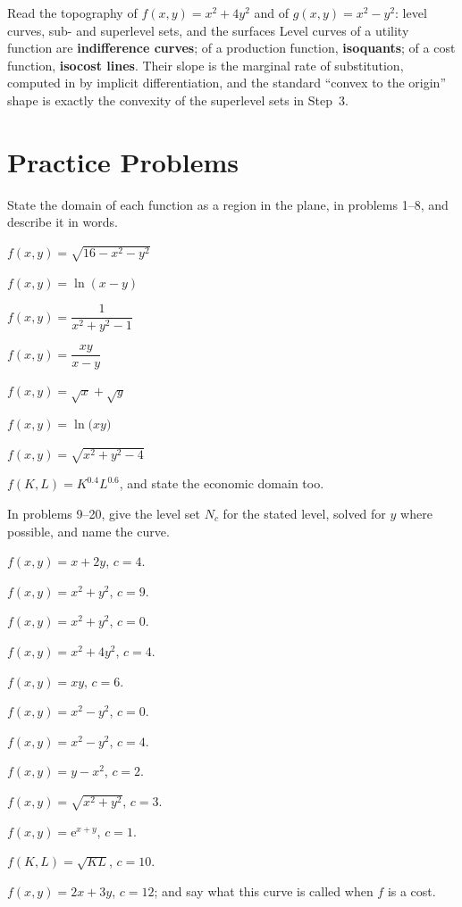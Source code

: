 \begin{worked}{Read the topography of $f(x,y)=x^{2}+4y^{2}$ and of $g(x,y)=x^{2}-y^{2}$: level curves, sub- and superlevel sets, and the surfaces}
Level curves of a utility function are \textbf{indifference curves}; of a
production function, \textbf{isoquants}; of a cost function,
\textbf{isocost lines}. Their slope is the marginal rate of substitution,
computed in  by implicit differentiation, and the standard
``convex to the origin'' shape is exactly the convexity of the superlevel
sets in Step~3.
\end{worked}

\section{Practice Problems}

State the domain of each function as a region in the plane, in problems
1--8, and describe it in words.

\begin{problems}
  \item $f(x,y)=\sqrt{16-x^{2}-y^{2}}$
  \item $f(x,y)=\ln(x-y)$
  \item $f(x,y)=\dfrac{1}{x^{2}+y^{2}-1}$
  \item $f(x,y)=\dfrac{xy}{x-y}$
  \item $f(x,y)=\sqrt{x}+\sqrt{y}$
  \item $f(x,y)=\ln\bigl(xy\bigr)$
  \item $f(x,y)=\sqrt{x^{2}+y^{2}-4}$
  \item $f(K,L)=K^{0.4}L^{0.6}$, and state the economic domain too.
\end{problems}

In problems 9--20, give the level set $N_{c}$ for the stated level, solved
for $y$ where possible, and name the curve.

\begin{problems}[resume]
  \item $f(x,y)=x+2y$, \;$c=4$.
  \item $f(x,y)=x^{2}+y^{2}$, \;$c=9$.
  \item $f(x,y)=x^{2}+y^{2}$, \;$c=0$.
  \item $f(x,y)=x^{2}+4y^{2}$, \;$c=4$.
  \item $f(x,y)=xy$, \;$c=6$.
  \item $f(x,y)=x^{2}-y^{2}$, \;$c=0$.
  \item $f(x,y)=x^{2}-y^{2}$, \;$c=4$.
  \item $f(x,y)=y-x^{2}$, \;$c=2$.
  \item $f(x,y)=\sqrt{x^{2}+y^{2}}$, \;$c=3$.
  \item $f(x,y)=\mathrm{e}^{x+y}$, \;$c=1$.
  \item $f(K,L)=\sqrt{KL}$, \;$c=10$.
  \item $f(x,y)=2x+3y$, \;$c=12$; and say what this curve is called when
        $f$ is a cost.
\end{problems}

